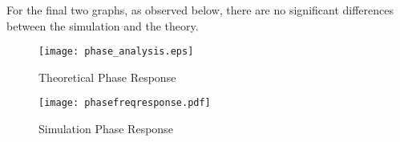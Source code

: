 For the final two graphs, as observed below, there are no significant differences between the simulation and the theory.

\begin{figure}[h]
\centering
  \texttt{[image: phase\_analysis.eps]}
  \caption{Theoretical Phase Response}
  \label{fig:sub5}
\end{figure}

\begin{figure}[h]
    \centering
  \texttt{[image: phasefreqresponse.pdf]}
  \caption{Simulation Phase Response}
  \label{fig:sub6}
\end{figure}

\clearpage
